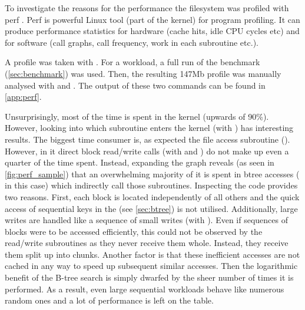         To investigate the reasons for the performance the filesystem was
        profiled with perf \cite{perf}. Perf is powerful Linux tool (part of
        the kernel) for program profiling. It can produce performance
        statistics for hardware (cache hits, idle CPU cycles etc) and for
        software (call graphs, call frequency, work in each subroutine etc.).

        A profile was taken with . For a
        workload, a full run of the benchmark (\autoref{sec:benchmark}) was used.
        Then, the resulting 147Mb profile was manually analysed with
         and . The output of these two commands can be found in
        \autoref{app:perf}.

        Unsurprisingly, most of the time is spent in the kernel (upwards of
        90\%). However, looking into which subroutine enters the kernel (with
        ) has interesting results. The biggest time
        consumer is, as expected the file access subroutine
        (). However, in it direct block
        read/write calls (with  and
        ) do not make up even a quarter of the time
        spent. Instead, expanding the graph reveals (as seen in
        \autoref{fig:perf_sample}) that an overwhelming majority of it is spent in btree
        accesses ( in this case) which indirectly
        call those subroutines. Inspecting the code provides two reasons.
        First, each block is located independently of all others and the quick
        access of sequential keys in the \bplustree{} (see \autoref{sec:btree}) is
        not utilised. Additionally, large writes are handled like a sequence of
        small writes (with ). Even if
        sequences of blocks were to be accessed efficiently, this could not be
        observed by the read/write subroutines as they never receive them whole.
        Instead, they receive them split up into chunks. Another factor is that
        these inefficient accesses are not cached in any way to speed up
        subsequent similar accesses. Then the logarithmic benefit of the B-tree
        search is simply dwarfed by the sheer number of times it is performed. As a
        result, even large sequential workloads behave like numerous random
        ones and a lot of performance is left on the table.

